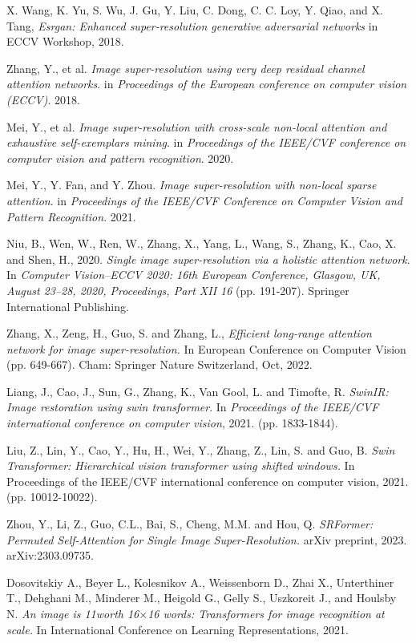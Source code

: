 \documentclass[twocolumn]{svjour3}          %
\begin{document}
\begin{thebibliography}{00}
 X. Wang, K. Yu, S. Wu, J. Gu, Y. Liu, C. Dong, C. C. Loy, Y. Qiao, and X. Tang, \textit{Esrgan: Enhanced super-resolution generative adversarial networks} in ECCV Workshop, 2018.

 Zhang, Y., et al. \textit{Image super-resolution using very deep residual channel attention networks}. in \textit{Proceedings of the European conference on computer vision (ECCV)}. 2018.

 Mei, Y., et al. \textit{Image super-resolution with cross-scale non-local attention and exhaustive self-exemplars mining}. in \textit{Proceedings of the IEEE/CVF conference on computer vision and pattern recognition}. 2020.

 Mei, Y., Y. Fan, and Y. Zhou. \textit{Image super-resolution with non-local sparse attention}. in \textit{Proceedings of the IEEE/CVF Conference on Computer Vision and Pattern Recognition}. 2021.

 Niu, B., Wen, W., Ren, W., Zhang, X., Yang, L., Wang, S., Zhang, K., Cao, X. and Shen, H., 2020. \textit{Single image super-resolution via a holistic attention network}. In \textit{Computer Vision–ECCV 2020: 16th European Conference, Glasgow, UK, August 23–28, 2020, Proceedings, Part XII 16} (pp. 191-207). Springer International Publishing.

 Zhang, X., Zeng, H., Guo, S. and Zhang, L., \textit{Efficient long-range attention network for image super-resolution.} In European Conference on Computer Vision (pp. 649-667). Cham: Springer Nature Switzerland, Oct, 2022.

 Liang, J., Cao, J., Sun, G., Zhang, K., Van Gool, L. and Timofte, R. \textit{SwinIR: Image restoration using swin transformer}. In \textit{Proceedings of the IEEE/CVF international conference on computer vision}, 2021. (pp. 1833-1844).

 Liu, Z., Lin, Y., Cao, Y., Hu, H., Wei, Y., Zhang, Z., Lin, S. and Guo, B. \textit{Swin Transformer: Hierarchical vision transformer using shifted windows.} In Proceedings of the IEEE/CVF international conference on computer vision, 2021. (pp. 10012-10022).

 Zhou, Y., Li, Z., Guo, C.L., Bai, S., Cheng, M.M. and Hou, Q. \textit{SRFormer: Permuted Self-Attention for Single Image Super-Resolution.} arXiv preprint, 2023. arXiv:2303.09735.

 Dosovitskiy A., Beyer L., Kolesnikov A., Weissenborn D., Zhai X., Unterthiner T., Dehghani M., Minderer M., Heigold G., Gelly S., Uszkoreit J., and Houlsby N. \textit{An image is 11worth 16$\times$16 words: Transformers for image recognition at scale.} In International Conference on Learning Representations, 2021.


\end{thebibliography}
\end{document}
